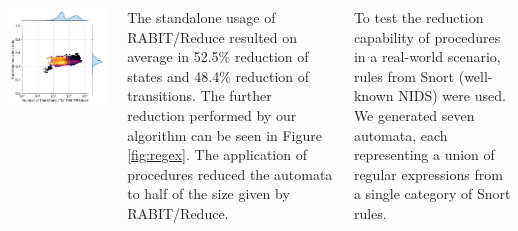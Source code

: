 \documentclass[25pt, a1paper, portrait]{tikzposter}
\begin{document}
\begin{columns}
{\begin{tikzfigure}
\begin{minipage}{0.21\textwidth}
                \includegraphics[width=1\linewidth]{images/intersect-all-trans.pdf}
            \end{minipage}
            \label{fig:regex}
        \end{tikzfigure}

        The standalone usage of RABIT/Reduce resulted on average in 52.5\% reduction of states and 48.4\% reduction of transitions. The further reduction performed by our algorithm can be seen in Figure \ref{fig:regex}. The application of procedures reduced the automata to half of the size given by RABIT/Reduce.
    }


     {

        To test the reduction capability of procedures in a real-world scenario, rules from Snort (well-known NIDS) were used. We generated seven automata, each representing a union of regular expressions from a single category of Snort rules.

}
\end{columns}
\end{document}
